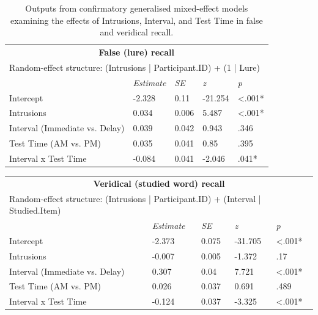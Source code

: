 \documentclass[
]{article}
\begin{document}
\begin{table}[H]

\caption{\label{tab:table4}Outputs from confirmatory generalised mixed-effect models examining the effects of Intrusions, Interval, and Test Time in false and veridical recall.}
\centering
\begin{tabular}[t]{lllll}
\toprule
\multicolumn{5}{c}{\textbf{False (lure) recall}} \\
\cmidrule(l{3pt}r{3pt}){1-5}
\multicolumn{5}{l}{Random-effect structure: (Intrusions | Participant.ID) + (1 | Lure)} \\
\cmidrule(l{3pt}r{3pt}){1-5}
\em{} & \em{Estimate} & \em{SE} & \em{z} & \em{p}\\
Intercept & -2.328 & 0.11 & -21.254 & <.001*\\
Intrusions & 0.034 & 0.006 & 5.487 & <.001*\\
Interval (Immediate vs. Delay) & 0.039 & 0.042 & 0.943 & .346\\
Test Time (AM vs. PM) & 0.035 & 0.041 & 0.85 & .395\\
\addlinespace
Interval x Test Time & -0.084 & 0.041 & -2.046 & .041*\\
\bottomrule
\end{tabular}
\end{table}

\begin{table}[H]
\centering
\begin{tabular}{lllll}
\toprule
\multicolumn{5}{c}{\textbf{Veridical (studied word) recall}} \\
\cmidrule(l{3pt}r{3pt}){1-5}
\multicolumn{5}{l}{Random-effect structure: (Intrusions | Participant.ID) + (Interval | Studied.Item)} \\
\cmidrule(l{3pt}r{3pt}){1-5}
\em{} & \em{Estimate} & \em{SE} & \em{z} & \em{p}\\
Intercept & -2.373 & 0.075 & -31.705 & <.001*\\
Intrusions & -0.007 & 0.005 & -1.372 & .17\\
Interval (Immediate vs. Delay) & 0.307 & 0.04 & 7.721 & <.001*\\
Test Time (AM vs. PM) & 0.026 & 0.037 & 0.691 & .489\\
\addlinespace
Interval x Test Time & -0.124 & 0.037 & -3.325 & <.001*\\
\bottomrule
\end{tabular}
\end{table}
\end{document}

